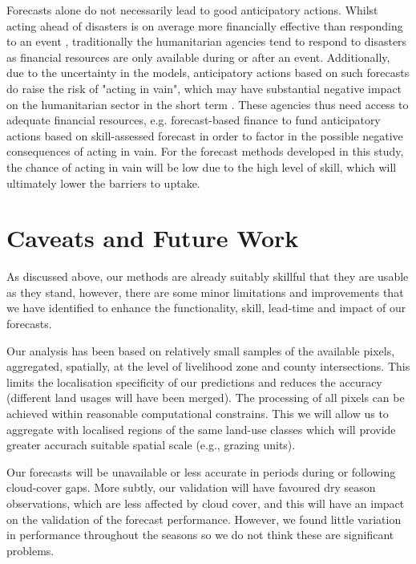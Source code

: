 \documentclass[review]{elsarticle}
\begin{document}
Forecasts alone do not necessarily lead to good anticipatory actions. Whilst acting ahead of disasters is on average more financially effective than responding to an event \citep{venton2012economics}, traditionally the humanitarian agencies tend to respond to disasters as financial resources are only available during or after an event. Additionally, due to the uncertainty in the models, anticipatory actions based on such forecasts do raise the risk of "acting in vain", which may have substantial negative impact on the humanitarian sector in the short term \citep{lopez2018bridging}. These agencies thus need access to adequate financial resources, e.g. forecast-based finance \citep[FbF,][]{nhess-15-895-2015} to fund anticipatory actions based on skill-assessed forecast in order to factor in the possible negative consequences of acting in vain. For the forecast methods developed in this study, the chance of acting in vain will be low due to the high level of skill, which will ultimately lower the barriers to uptake.




\section{Caveats and Future Work}
 \label{sec:futurework}

As discussed above, our methods are already suitably skillful that they are usable as they stand, however, there are some minor limitations and improvements that we have identified to enhance the functionality, skill, lead-time and impact of our forecasts. 


Our analysis has been based on relatively small samples of the available pixels, aggregated, spatially, at the level of livelihood zone and county intersections. This limits the localisation specificity of our predictions and reduces the accuracy (different land usages will have been merged).  The processing of all pixels can be achieved within reasonable computational constrains. This we will allow us to aggregate with localised regions of the same land-use classes which will provide greater accurach  suitable spatial scale (e.g., grazing units). 


 Our forecasts will be unavailable or less accurate in periods during or following cloud-cover gaps. More subtly, our validation will have favoured dry season observations, which are less affected by cloud cover, and this will have an impact on  the validation of the forecast performance. However, we found little variation in performance throughout the seasons so we do not think these are significant problems. 
 
\end{document}

